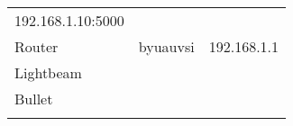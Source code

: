 \documentclass[]{auvsi_doc}
\begin{document}
\begin{longtable}[]{@{}lll@{}}
\begin{minipage}[t]{0.30\columnwidth}
{192.168.1.10:5000}\strut
\end{minipage}\tabularnewline
\begin{minipage}[t]{0.30\columnwidth}\raggedright\strut
{Router}\strut
\end{minipage} & \begin{minipage}[t]{0.30\columnwidth}\raggedright\strut
{byuauvsi}\strut
\end{minipage} & \begin{minipage}[t]{0.30\columnwidth}\raggedright\strut
{192.168.1.1}\strut
\end{minipage}\tabularnewline
\begin{minipage}[t]{0.30\columnwidth}\raggedright\strut
{Lightbeam}\strut
\end{minipage} & \begin{minipage}[t]{0.30\columnwidth}\raggedright\strut
{}\strut
\end{minipage} & \begin{minipage}[t]{0.30\columnwidth}\raggedright\strut
{}\strut
\end{minipage}\tabularnewline
\begin{minipage}[t]{0.30\columnwidth}\raggedright\strut
{Bullet}\strut
\end{minipage} & \begin{minipage}[t]{0.30\columnwidth}\raggedright\strut
{}\strut
\end{minipage} & \begin{minipage}[t]{0.30\columnwidth}\raggedright\strut
{}\strut
\end{minipage}\tabularnewline
\begin{minipage}[t]{0.30\columnwidth}\raggedright\strut
{}\strut
\end{minipage} & \begin{minipage}[t]{0.30\columnwidth}\raggedright\strut
{}\strut
\end{minipage} & \begin{minipage}[t]{0.30\columnwidth}\raggedright\strut
{}\strut
\end{minipage}\tabularnewline
\bottomrule
\end{longtable}

{}

{}

{}

{}
\end{document}
